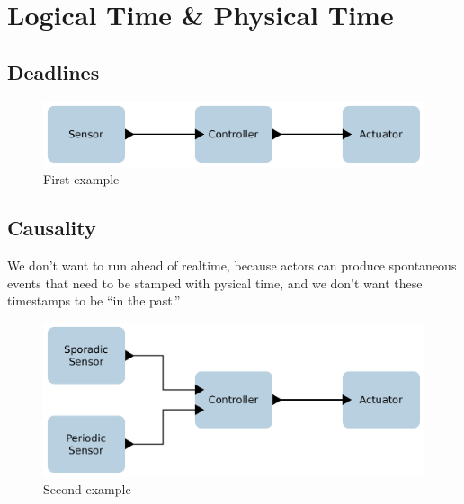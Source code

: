 \documentclass[sigconf]{acmart}
\begin{document}
% 


\section{Logical Time \& Physical Time}

\subsection{Deadlines}
\begin{figure}[ht]
 \centering
 \includegraphics[width=\linewidth]{img/example-1}
 \caption{First example}
 \label{fig:example-1}
\end{figure}

\subsection{Causality}
We don't want to run ahead of realtime, because actors can produce spontaneous events that need to be stamped with 
pysical time, and we don't want these timestamps to be ``in the past.''

\begin{figure}[ht]
 \centering
 \includegraphics[width=\linewidth]{img/example-2}
 \caption{Second example}
 \label{fig:example-2}
\end{figure}
\end{document}
